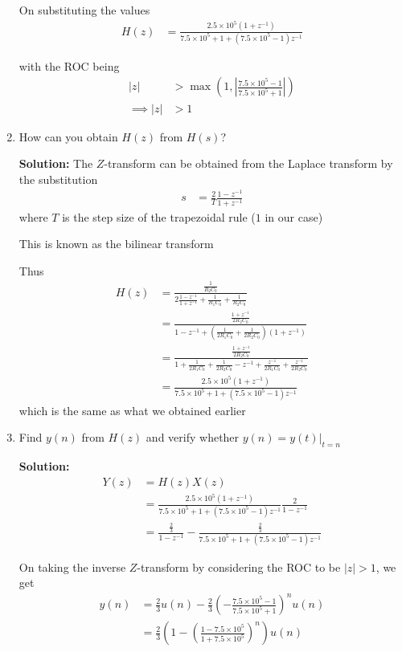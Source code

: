 \documentclass[journal,12pt,twocolumn]{IEEEtran}
\newcommand{\solution}{\noindent \textbf{Solution: }}
\providecommand{\brak}[1]{\ensuremath{\left(#1\right)}}
\providecommand{\abs}[1]{\left\vert#1\right\vert}
\numberwithin{equation}{section}
\numberwithin{figure}{section}
\renewcommand\thesection{\arabic{section}}
\begin{document}
\begin{enumerate}[label=\thesection.\arabic*.,ref=\thesection.\theenumi]
	On substituting the values
	\begin{align}
		H(z) &= \frac{2.5\times10^5 (1+z^{-1})}{7.5\times10^5 + 1 + (7.5\times10^5 - 1)z^{-1}}
	\end{align}
	
	with the ROC being
	\begin{align}
		\abs{z} &> \max\brak{1, \abs{\frac{7.5\times10^5 - 1}{7.5\times10^5 + 1}}} \\
		\implies \abs{z} &> 1
	\end{align}
	
	\item How can you obtain $H(z)$ from $H(s)$?
	
	\solution The $Z$-transform can be obtained from the Laplace transform by the substitution
	\begin{align}
		s &= \frac{2}{T} \frac{1-z^{-1}}{1+z^{-1}}
	\end{align}
	where $T$ is the step size of the trapezoidal rule ($1$ in our case)
	
	This is known as the bilinear transform
	
	Thus
	\begin{align}
		H(z) &= \frac{\frac{1}{R_2C_0}}{2\frac{1-z^{-1}}{1+z^{-1}} + \frac{1}{R_1C_0} + \frac{1}{R_2C_0}} \\
		&= \frac{\frac{1 + z^{-1}}{2R_2C_0}}{1-z^{-1}	 + \brak{\frac{1}{2R_1C_0} + \frac{1}{2R_2C_0}}(1 + z^{-1})} \\
		&= \frac{\frac{1 + z^{-1}}{2R_2C_0}}{1 + \frac{1}{2R_1C_0} + \frac{1}{2R_2C_0} - z^{-1} + \frac{z^{-1}}{2R_1C_0} + \frac{z^{-1}}{2R_2C_0}} \\
		&= \frac{2.5\times10^5 (1+z^{-1})}{7.5\times10^5 + 1 + (7.5\times10^5 - 1)z^{-1}}
	\end{align}
	which is the same as what we obtained earlier
	
	\item Find $y(n)$ from $H(z)$ and verify whether $y(n) = y(t)|_{t=n}$
	
	\solution 
	\begin{align}
		Y(z) &= H(z)X(z) \\
		&= \frac{2.5\times10^5 (1+z^{-1})}{7.5\times10^5 + 1 + (7.5\times10^5 - 1)z^{-1}} \frac{2}{1-z^{-1}} \\
		&= \frac{\frac{2}{3}}{1-z^{-1}} -\frac{\frac{2}{3}}{7.5\times10^5 + 1 + (7.5\times10^5 - 1)z^{-1}}
	\end{align}
	
	On taking the inverse $Z$-transform by considering the ROC to be $\abs{z} > 1$, we get
	\begin{align}
		y(n) &= \frac{2}{3}u(n) - \frac{2}{3}\brak{-\frac{7.5\times10^5 - 1}{7.5\times10^5 + 1}}^nu(n) \\
		&= \frac{2}{3} \brak{1 - \brak{\frac{1-7.5\times10^5}{1+7.5\times10^5}}^n}u(n)
	\end{align}
	

\end{enumerate}
\end{document}
